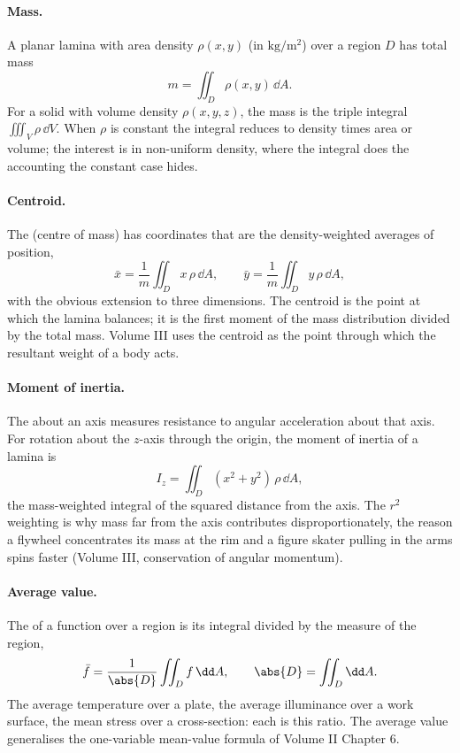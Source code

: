 \paragraph{Mass.} A planar lamina with area density $\rho(x, y)$ (in
$\si{\kilogram\per\meter\squared}$) over a region $D$ has total mass
\[
m = \iint_{D} \rho(x, y)\,\dd A.
\]
For a solid with volume density $\rho(x, y, z)$, the mass is the
triple integral $\iiint_{V}\rho\,\dd V$. When $\rho$ is constant the
integral reduces to density times area or volume; the interest is in
non-uniform density, where the integral does the accounting the
constant case hides.

\paragraph{Centroid.} The  (centre of mass) has
coordinates that are the density-weighted averages of position,
\[
\bar{x} = \frac{1}{m}\iint_{D} x\,\rho\,\dd A, \qquad
\bar{y} = \frac{1}{m}\iint_{D} y\,\rho\,\dd A,
\]
with the obvious extension to three dimensions. The centroid is the
point at which the lamina balances; it is the first moment of the
mass distribution divided by the total mass. Volume III uses the
centroid as the point through which the resultant weight of a body
acts.

\paragraph{Moment of inertia.} The  about
an axis measures resistance to angular acceleration about that axis.
For rotation about the $z$-axis through the origin, the moment of
inertia of a lamina is
\[
I_{z} = \iint_{D} (x^{2} + y^{2})\,\rho\,\dd A,
\]
the mass-weighted integral of the squared distance from the axis.
The $r^{2}$ weighting is why mass far from the axis contributes
disproportionately, the reason a flywheel concentrates its mass at
the rim and a figure skater pulling in the arms spins faster
(Volume III, conservation of angular momentum).

\paragraph{Average value.} The  of a function
over a region is its integral divided by the measure of the region,
\[
\bar{f} = \frac{1}{\abs{D}}\iint_{D} f\,\dd A, \qquad
\abs{D} = \iint_{D}\dd A.
\]
The average temperature over a plate, the average illuminance over a
work surface, the mean stress over a cross-section: each is this
ratio. The average value generalises the one-variable mean-value
formula of Volume II Chapter 6.

